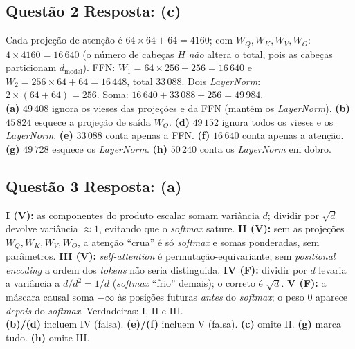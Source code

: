 \documentclass[11pt,a4paper]{article}
\begin{document}
\subsection*{Questão 2 \textemdash{} Resposta: (c)}
Cada projeção de atenção é $64\times 64 + 64 = 4160$; com $W_Q, W_K, W_V, W_O$: $4 \times 4160 = 16\,640$ (o número de cabeças $H$ \emph{não} altera o total, pois as cabeças particionam $d_{\text{model}}$). FFN: $W_1 = 64\times 256 + 256 = 16\,640$ e $W_2 = 256\times 64 + 64 = 16\,448$, total $33\,088$. Dois \textit{LayerNorm}: $2 \times (64 + 64) = 256$. Soma: $16\,640 + 33\,088 + 256 = 49\,984$.\\
\textbf{(a)} $49\,408$ ignora os vieses das projeções e da FFN (mantém os \textit{LayerNorm}).
\textbf{(b)} $45\,824$ esquece a projeção de saída $W_O$.
\textbf{(d)} $49\,152$ ignora todos os vieses e os \textit{LayerNorm}.
\textbf{(e)} $33\,088$ conta apenas a FFN.
\textbf{(f)} $16\,640$ conta apenas a atenção.
\textbf{(g)} $49\,728$ esquece os \textit{LayerNorm}.
\textbf{(h)} $50\,240$ conta os \textit{LayerNorm} em dobro.

\subsection*{Questão 3 \textemdash{} Resposta: (a)}
\textbf{I (V):} as componentes do produto escalar somam variância $d$; dividir por $\sqrt{d}$ devolve variância $\approx 1$, evitando que o \textit{softmax} sature.
\textbf{II (V):} sem as projeções $W_Q, W_K, W_V, W_O$, a atenção ``crua'' é só \textit{softmax} e somas ponderadas, sem parâmetros.
\textbf{III (V):} \textit{self-attention} é permutação-equivariante; sem \textit{positional encoding} a ordem dos \textit{tokens} não seria distinguida.
\textbf{IV (F):} dividir por $d$ levaria a variância a $d/d^2 = 1/d$ (\textit{softmax} ``frio'' demais); o correto é $\sqrt{d}$.
\textbf{V (F):} a máscara causal soma $-\infty$ às posições futuras \emph{antes} do \textit{softmax}; o peso $0$ aparece \emph{depois} do \textit{softmax}.
Verdadeiras: I, II e III.\\
\textbf{(b)/(d)} incluem IV (falsa).
\textbf{(e)/(f)} incluem V (falsa).
\textbf{(c)} omite II.
\textbf{(g)} marca tudo.
\textbf{(h)} omite III.
\end{document}
